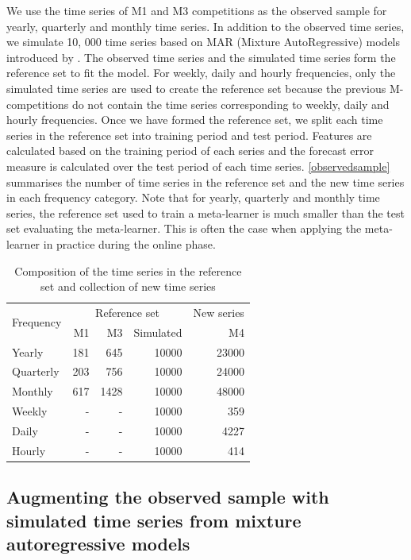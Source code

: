 \documentclass[11pt,a4paper,]{article}
\begin{document}
We use the time series of M1 and M3 competitions as the observed sample for yearly, quarterly and monthly time series. In addition to the observed time series, we simulate 10, 000 time series based on MAR (Mixture AutoRegressive) models introduced by \textcite{kang2019gratis}. The observed time series and the simulated time series form the reference set to fit the model. For weekly, daily and hourly frequencies, only the simulated time series are used to create the reference set because the previous M-competitions do not contain the time series corresponding to weekly, daily and hourly frequencies. Once we have formed the reference set, we split each time series in the reference set into training period and test period. Features are calculated based on the training period of each series and the forecast error measure is calculated over the test period of each time series. \autoref{observedsample} summarises the number of time series in the reference set and the new time series in each frequency category. Note that for yearly, quarterly and monthly time series, the reference set used to train a meta-learner is much smaller than the test set evaluating the meta-learner. This is often the case when applying the meta-learner in practice during the online phase.

\begin{table}[!h]
\centering
\caption{Composition of the time series in the reference set and collection of new time series}
\label{observedsample}
\begin{tabular}{l|rrr|r}
\multirow{2}{*}{Frequency} & \multicolumn{3}{c|}{Reference set} &  New series \\ 
                  &   M1    &    M3   &    Simulated  &  M4 \\ \hline
  Yearly          &   181    &   645    &   10000   & 23000 \\
  Quarterly       &   203    &    756   &   10000   &  24000\\
  Monthly         &   617    &    1428   &  10000    &  48000\\
  Weekly          &   -    &   -    &  10000   & 359 \\
  Daily           &   -    &   -    &  10000   & 4227 \\
  Hourly          &   -    &    -   &  10000    & 414\\ \hline
\end{tabular}
\end{table}

\hypertarget{augmenting-the-observed-sample-with-simulated-time-series-from-mixture-autoregressive-models}{%
\subsection{Augmenting the observed sample with simulated time series from mixture autoregressive models}\label{augmenting-the-observed-sample-with-simulated-time-series-from-mixture-autoregressive-models}}
\end{document}

